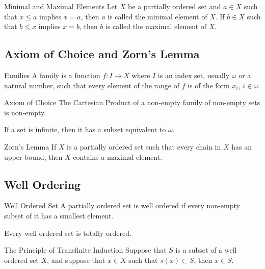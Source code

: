 \begin{defn}{Minimal and Maximal Elements}{} Let $X$ be a partially ordered set and $a\in X$ such that $x\leq a$ implies $x=a$, then $a$ is called the minimal element of $X$. If $b\in X$ such that $b\leq x$ implies $x=b$, then $b$ is called the maximal element of $X$. 
\end{defn}

\subsection{Axiom of Choice and Zorn's Lemma}
\begin{defn}{Families}{} A family is a function $f:I\to X$ where $I$ is an index set, usually $\omega$ or a natural number, such that every element of the range of $f$ is of the form $x_i$, $i\in\omega$. 
\end{defn}

\begin{axm}{Axiom of Choice}{} The Cartesian Product of a non-empty family of non-empty sets is non-empty. 
\end{axm}

\begin{thm}{}{} If a set is infinite, then it has a subset equivalent to $\omega$. 
\end{thm}

\begin{thm}{Zorn's Lemma}{} If $X$ is a partially ordered set such that every chain in $X$ has an upper bound, then $X$ contains a maximal element. 
\end{thm}

\subsection{Well Ordering}
\begin{defn}{Well Ordered Set}{} A partially ordered set is well ordered if every non-empty subset of it has a smallest element. 
\end{defn}

\begin{thm}{}{} Every well ordered set is totally ordered. 
\end{thm}

\begin{thm}{The Principle of Transfinite Induction}{} Suppose that $S$ is a subset of a well ordered set $X$, and suppose that $x\in X$ such that $s(x)\subset S$, then $x\in S$. 
\end{thm}


